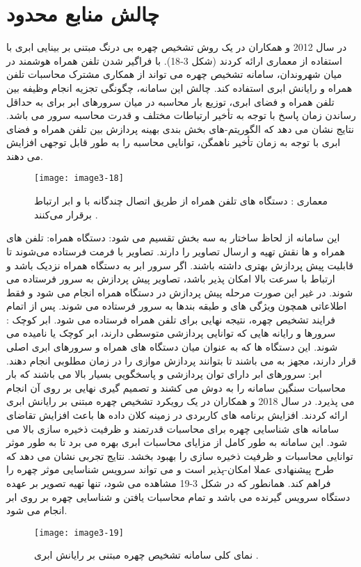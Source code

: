 \section{چالش منابع محدود}
در سال 2012  و همکاران در \cite{6249269} یک روش تشخیص چهره بی درنگ مبتنی بر بینایی ابری  با استفاده از معماری  ارائه کردند (شکل 3-18). با فراگیر شدن تلفن همراه هوشمند در میان شهروندان، سامانه تشخیص چهره می تواند از همکاری مشترک محاسبات تلفن همراه و رایانش ابری استفاده کند. چالش این سامانه، چگونگی تجزیه انجام وظیفه بین تلفن همراه و فضای ابری، توزیع بار محاسبه در میان سرورهای ابر برای به حداقل رساندن زمان پاسخ با توجه به تأخیر ارتباطات مختلف و قدرت محاسبه سرور می باشد. نتایج نشان می دهد که الگوریتم-های بخش بندی بهینه پردازش بین تلفن همراه و فضای ابری با توجه به زمان تأخیر ناهمگن، توانایی محاسبه را به طور قابل توجهی افزایش می دهند. 
 \begin{figure}[h]
\centering
  \texttt{[image: image3-18]}
  \caption{معماری : دستگاه های تلفن همراه از طریق اتصال چندگانه با  و ابر ارتباط برقرار می‌کنند \cite{ref1}.}
  \label{image2-1}
\end{figure}
\noindent
این سامانه از لحاظ ساختار به سه بخش تقسیم می شود:
\noindent
دستگاه همراه: تلفن های همراه و  ها نقش تهیه و ارسال تصاویر را دارند. تصاویر با فرمت  فرستاده می‌شوند تا قابلیت پیش پردازش بهتری داشته باشند. اگر سرور ابر به دستگاه همراه نزدیک باشد و ارتباط با سرعت بالا امکان پذیر باشد، تصاویر پیش پردازش به سرور فرستاده می شوند. در غیر این صورت مرحله پیش پردازش در دستگاه همراه انجام می شود و فقط اطلاعاتی همچون ویژگی های  و طبقه بندها به سرور فرستاده می شوند. پس از اتمام فرایند تشخیص چهره، نتیجه نهایی برای تلفن همراه فرستاده می شود.
\noindent
ابر کوچک : سرورها و رایانه هایی که توانایی پردازشی متوسطی دارند، ابر کوچک یا  نامیده می شوند. این دستگاه ها که به عنوان میان دستگاه های همراه و سرورهای ابری اصلی قرار دارند، مجهز به  می باشند تا بتوانند پردازش موازی را در زمان مطلوبی انجام دهند.
ابر: سرورهای ابر دارای توان پردازشی و پاسخگویی بسیار بالا می باشند که بار محاسبات سنگین سامانه را به دوش می کشند و تصمیم گیری نهایی بر روی آن انجام می پذیرد.
\noindent
در سال 2018  و همکاران در \cite{HU2018582} یک رویکرد تشخیص چهره مبتنی بر رایانش ابری ارائه کردند. افزایش برنامه های کاربردی در زمینه کلان داده ها باعث افزایش تقاضای سامانه های شناسایی چهره برای محاسبات قدرتمند و ظرفیت ذخیره سازی بالا می شود. این سامانه به طور کامل از مزایای محاسبات ابری بهره می برد تا به طور موثر توانایی محاسبات و ظرفیت ذخیره سازی را بهبود بخشد. نتایج تجربی نشان می دهد که طرح پیشنهادی عملا امکان-پذیر است و می تواند سرویس شناسایی موثر چهره را فراهم کند. همانطور که در شکل 3-19 مشاهده می شود، تنها تهیه تصویر بر عهده دستگاه سرویس گیرنده می باشد و تمام محاسبات یافتن و شناسایی چهره بر روی ابر انجام می شود.
 \begin{figure}[h]
\centering
  \texttt{[image: image3-19]}
  \caption{نمای کلی سامانه تشخیص چهره مبتنی بر رایانش ابری \cite{ref1}.}
  \label{image2-1}
\end{figure}

